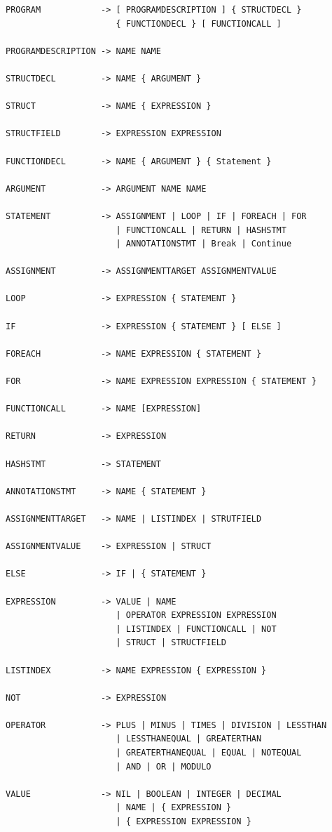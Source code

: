 
\begin{lstlisting}[caption={Psnodig's grammar in EBNF notation.}, captionpos=b, label={Psnodig's EBNF.}]
PROGRAM            -> [ PROGRAMDESCRIPTION ] { STRUCTDECL }
                      { FUNCTIONDECL } [ FUNCTIONCALL ]

PROGRAMDESCRIPTION -> NAME NAME

STRUCTDECL         -> NAME { ARGUMENT }

STRUCT             -> NAME { EXPRESSION }

STRUCTFIELD        -> EXPRESSION EXPRESSION

FUNCTIONDECL       -> NAME { ARGUMENT } { Statement }

ARGUMENT           -> ARGUMENT NAME NAME

STATEMENT          -> ASSIGNMENT | LOOP | IF | FOREACH | FOR
                      | FUNCTIONCALL | RETURN | HASHSTMT
                      | ANNOTATIONSTMT | Break | Continue

ASSIGNMENT         -> ASSIGNMENTTARGET ASSIGNMENTVALUE

LOOP               -> EXPRESSION { STATEMENT }

IF                 -> EXPRESSION { STATEMENT } [ ELSE ]

FOREACH            -> NAME EXPRESSION { STATEMENT }

FOR                -> NAME EXPRESSION EXPRESSION { STATEMENT }

FUNCTIONCALL       -> NAME [EXPRESSION]

RETURN             -> EXPRESSION

HASHSTMT           -> STATEMENT

ANNOTATIONSTMT     -> NAME { STATEMENT }

ASSIGNMENTTARGET   -> NAME | LISTINDEX | STRUTFIELD

ASSIGNMENTVALUE    -> EXPRESSION | STRUCT

ELSE               -> IF | { STATEMENT }

EXPRESSION         -> VALUE | NAME
                      | OPERATOR EXPRESSION EXPRESSION
                      | LISTINDEX | FUNCTIONCALL | NOT
                      | STRUCT | STRUCTFIELD

LISTINDEX          -> NAME EXPRESSION { EXPRESSION }

NOT                -> EXPRESSION

OPERATOR           -> PLUS | MINUS | TIMES | DIVISION | LESSTHAN
                      | LESSTHANEQUAL | GREATERTHAN
                      | GREATERTHANEQUAL | EQUAL | NOTEQUAL
                      | AND | OR | MODULO

VALUE              -> NIL | BOOLEAN | INTEGER | DECIMAL
                      | NAME | { EXPRESSION }
                      | { EXPRESSION EXPRESSION }
\end{lstlisting}


